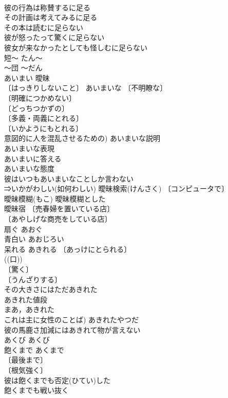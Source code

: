 \documentclass[8pt]{extreport}
\begin{document}
\begin{CJK}{UTF8}{min}
\\	彼の行為は称賛するに足る 
\\	その計画は考えてみるに足る 
\\	その本は読むに足らない 
\\	彼が怒ったって驚くに足らない 
\\	彼女が来なかったとしても怪しむに足らない 
\\	短～	たん～	
\\	～団	～だん	
\\	あいまい	曖昧	
\\	〔はっきりしないこと〕 あいまいな 〔不明瞭な〕
\\	〔明確につかめない〕
\\	〔どっちつかずの〕
\\	〔多義・両義にとれる〕
\\	〔いかようにもとれる〕
\\	意図的に人を混乱させるための) あいまいな説明 
\\	あいまいな表現 
\\	あいまいに答える 
\\	あいまいな態度 
\\	彼はいつもあいまいなことしか言わない 
\\	⇒いかがわしい(如何わしい) 曖昧検索(けんさく) 〔コンピュータで〕
\\	曖昧模糊(もこ) 曖昧模糊とした 
\\	曖昧宿 〔売春婦を置いている店〕
\\	〔あやしげな商売をしている店〕
\\	扇ぐ	あおぐ	
\\	青白い	あおじろい	
\\	呆れる	あきれる	〔あっけにとられる〕
\\	((口)) 
\\	〔驚く〕
\\	〔うんざりする〕
\\	その大きさにはただあきれた 
\\	あきれた値段 
\\	まあ，あきれた 
\\	これは主に女性のことば) あきれたやつだ 
\\	彼の馬鹿さ加減にはあきれて物が言えない 
\\	あくび	あくび	
\\	飽くまで	あくまで	
\\	〔最後まで〕
\\	〔根気強く〕
\\	彼は飽くまでも否定(ひてい)した 
\\	飽くまでも戦い抜く 

\end{CJK}
\end{document}
